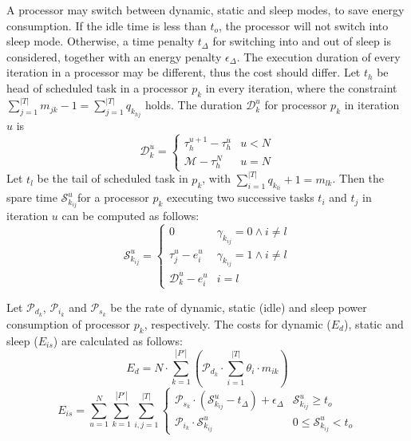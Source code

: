 A processor may switch between dynamic, static and sleep modes, to save energy consumption. If the idle time is less than $t_{o}$, the processor will not switch into sleep mode. Otherwise, a time penalty $t_\Delta$  for switching into and out of sleep is considered, together with an energy penalty $\epsilon_\Delta$.
The execution duration of every iteration in a processor may be different, thus the cost should differ. Let $t_h$ be head of scheduled task in a processor $p_k$ in every iteration, where the constraint  $\sum^{|T|}_{j=1} m_{jk}-1=\sum^{|T|}_{j=1} q_{k_{hj}}$ holds. The duration ${\mathcal{D}}^u_{k}$ for processor $p_k$ in iteration $u$ is
\begin{equation}\label{eq:duration}
{\mathcal{D}}^u_{k} =\left\{
\begin{array}{ll}
\tau^{u+1}_h -\tau^u_h & u<N\\
{\mathcal{M}} - \tau^N_h & u=N
\end{array}
\right.
\end{equation}
Let $t_l$ be the tail of scheduled task in $p_k$, with $\sum^{|T|}_{i=1} q_{k_{li}}+1=m_{lk}$.
Then the spare time ${\mathcal{S}}^u_{k_{ij}} $for a processor $p_k$ executing two successive tasks $t_i$ and $t_j$ in iteration $u$ can be computed as follows:
\begin{equation}\label{eq:spare}
{\mathcal{S}}^u_{k_{ij}} =\left\{
\begin{array}{ll}
0 & \gamma_{k_{ij}}=0\wedge i\neq l\\
\tau^u_j-e^u_i & \gamma_{k_{ij}}=1 \wedge i\neq l\\
{\mathcal{D}}^u_k-e^u_i & i=l
\end{array}\right.
\end{equation}

Let ${\mathcal{P}}_{d_k}$, ${\mathcal{P}}_{i_k}$ and ${\mathcal{P}}_{s_k}$ be the rate of dynamic, static (idle) and sleep power consumption of processor $p_k$, respectively. The costs for dynamic ($E_d$), static and sleep ($E_{is}$) are calculated as follows:
 \begin{equation}
E_d = N\cdot \sum^{|P'|}_{k=1}({\mathcal{P}}_{d_k}\cdot \sum^{|T|}_{i=1}  \theta_i \cdot m_{ik})
\end{equation}%
\begin{equation}\label{eq:ei}
E_{is} =\sum^N_{u=1}\sum^{|P'|}_{k=1}\sum^{|T|}_{i,j=1}\left\{
\begin{array}{ll}
{\mathcal{P}}_{s_k}\!\!\cdot ({\mathcal{S}}^u_{k_{ij}}-t_\Delta) + \epsilon_\Delta & {\mathcal{S}}^u_{k_{ij}} \!\!\geq t_{o} \\
 {\mathcal{P}}_{i_k}\!\!\cdot {\mathcal{S}}^u_{k_{ij}} &0 \leq {\mathcal{S}}^u_{k_{ij}}\!\! <t_{o} %
\end{array}
\right.
\end{equation}%




